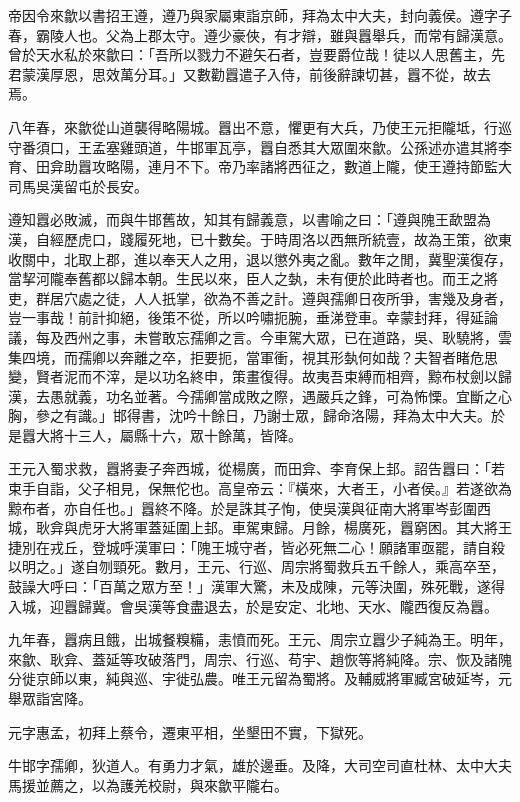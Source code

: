 \begin{pinyinscope}
帝因令來歙以書招王遵，遵乃與家屬東詣京師，拜為太中大夫，封向義侯。遵字子春，霸陵人也。父為上郡太守。遵少豪俠，有才辯，雖與囂舉兵，而常有歸漢意。曾於天水私於來歙曰：「吾所以戮力不避矢石者，豈要爵位哉！徒以人思舊主，先君蒙漢厚恩，思效萬分耳。」又數勸囂遣子入侍，前後辭諫切甚，囂不從，故去焉。

八年春，來歙從山道襲得略陽城。囂出不意，懼更有大兵，乃使王元拒隴坻，行巡守番須口，王孟塞雞頭道，牛邯軍瓦亭，囂自悉其大眾圍來歙。公孫述亦遣其將李育、田弇助囂攻略陽，連月不下。帝乃率諸將西征之，數道上隴，使王遵持節監大司馬吳漢留屯於長安。

遵知囂必敗滅，而與牛邯舊故，知其有歸義意，以書喻之曰：「遵與隗王歃盟為漢，自經歷虎口，踐履死地，已十數矣。于時周洛以西無所統壹，故為王策，欲東收關中，北取上郡，進以奉天人之用，退以懲外夷之亂。數年之閒，冀聖漢復存，當挈河隴奉舊都以歸本朝。生民以來，臣人之埶，未有便於此時者也。而王之將吏，群居穴處之徒，人人扺掌，欲為不善之計。遵與孺卿日夜所爭，害幾及身者，豈一事哉！前計抑絕，後策不從，所以吟嘯扼腕，垂涕登車。幸蒙封拜，得延論議，每及西州之事，未嘗敢忘孺卿之言。今車駕大眾，已在道路，吳、耿驍將，雲集四境，而孺卿以奔離之卒，拒要扼，當軍衝，視其形埶何如哉？夫智者睹危思變，賢者泥而不滓，是以功名終申，策畫復得。故夷吾束縛而相齊，黥布杖劍以歸漢，去愚就義，功名並著。今孺卿當成敗之際，遇嚴兵之鋒，可為怖慄。宜斷之心胸，參之有識。」邯得書，沈吟十餘日，乃謝士眾，歸命洛陽，拜為太中大夫。於是囂大將十三人，屬縣十六，眾十餘萬，皆降。

王元入蜀求救，囂將妻子奔西城，從楊廣，而田弇、李育保上邽。詔告囂曰：「若束手自詣，父子相見，保無佗也。高皇帝云：『橫來，大者王，小者侯。』若遂欲為黥布者，亦自任也。」囂終不降。於是誅其子恂，使吳漢與征南大將軍岑彭圍西城，耿弇與虎牙大將軍蓋延圍上邽。車駕東歸。月餘，楊廣死，囂窮困。其大將王捷別在戎丘，登城呼漢軍曰：「隗王城守者，皆必死無二心！願諸軍亟罷，請自殺以明之。」遂自刎頸死。數月，王元、行巡、周宗將蜀救兵五千餘人，乘高卒至，鼓譟大呼曰：「百萬之眾方至！」漢軍大驚，未及成陳，元等決圍，殊死戰，遂得入城，迎囂歸冀。會吳漢等食盡退去，於是安定、北地、天水、隴西復反為囂。

九年春，囂病且餓，出城餐糗糒，恚憤而死。王元、周宗立囂少子純為王。明年，來歙、耿弇、蓋延等攻破落門，周宗、行巡、苟宇、趙恢等將純降。宗、恢及諸隗分徙京師以東，純與巡、宇徙弘農。唯王元留為蜀將。及輔威將軍臧宮破延岑，元舉眾詣宮降。

元字惠孟，初拜上蔡令，遷東平相，坐墾田不實，下獄死。

牛邯字孺卿，狄道人。有勇力才氣，雄於邊垂。及降，大司空司直杜林、太中大夫馬援並薦之，以為護羌校尉，與來歙平隴右。


\end{pinyinscope}
